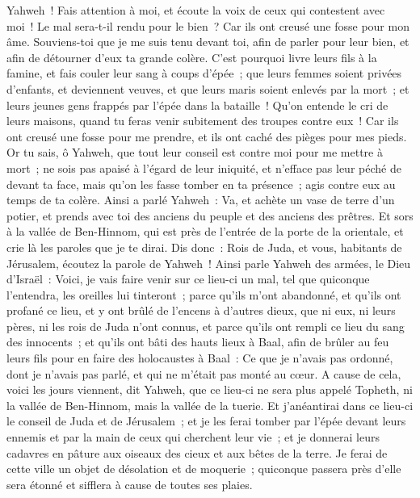 \begin{multicols}{2}
Yahweh~! Fais attention à moi, et écoute la voix de ceux qui contestent avec moi~!
Le mal sera-t-il rendu pour le bien~? Car ils ont creusé une fosse pour mon âme. Souviens-toi que je me suis tenu devant toi, afin de parler pour leur bien, et afin de détourner d'eux ta grande colère.
C'est pourquoi livre leurs fils à la famine, et fais couler leur sang à coups d'épée~; que leurs femmes soient privées d'enfants, et deviennent veuves, et que leurs maris soient enlevés par la mort~; et leurs jeunes gens frappés par l'épée dans la bataille~!
Qu'on entende le cri de leurs maisons, quand tu feras venir subitement des troupes contre eux~! Car ils ont creusé une fosse pour me prendre, et ils ont caché des pièges pour mes pieds.
Or tu sais, ô Yahweh, que tout leur conseil est contre moi pour me mettre à mort~; ne sois pas apaisé à l'égard de leur iniquité, et n'efface pas leur péché de devant ta face, mais qu'on les fasse tomber en ta présence~; agis contre eux au temps de ta colère.
\VerseOne{}Ainsi a parlé Yahweh~: Va, et achète un vase de terre d'un potier, et prends avec toi des anciens du peuple et des anciens des prêtres.
Et sors à la vallée de Ben-Hinnom, qui est près de l'entrée de la porte de la orientale, et crie là les paroles que je te dirai.
Dis donc~: Rois de Juda, et vous, habitants de Jérusalem, écoutez la parole de Yahweh~! Ainsi parle Yahweh des armées, le Dieu d'Israël~: Voici, je vais faire venir sur ce lieu-ci un mal, tel que quiconque l'entendra, les oreilles lui tinteront~; 
parce qu'ils m'ont abandonné, et qu'ils ont profané ce lieu, et y ont brûlé de l'encens à d'autres dieux, que ni eux, ni leurs pères, ni les rois de Juda n'ont connus, et parce qu'ils ont rempli ce lieu du sang des innocents~;
et qu'ils ont bâti des hauts lieux à Baal, afin de brûler au feu leurs fils pour en faire des holocaustes à Baal~: Ce que je n'avais pas ordonné, dont je n'avais pas parlé, et qui ne m'était pas monté au cœur.
A cause de cela, voici les jours viennent, dit Yahweh, que ce lieu-ci ne sera plus appelé Topheth, ni la vallée de Ben-Hinnom, mais la vallée de la tuerie.
Et j'anéantirai dans ce lieu-ci le conseil de Juda et de Jérusalem~; et je les ferai tomber par l'épée devant leurs ennemis et par la main de ceux qui cherchent leur vie~; et je donnerai leurs cadavres en pâture aux oiseaux des cieux et aux bêtes de la terre.
Je ferai de cette ville un objet de désolation et de moquerie~; quiconque passera près d'elle sera étonné et sifflera à cause de toutes ses plaies.

\end{multicols}
